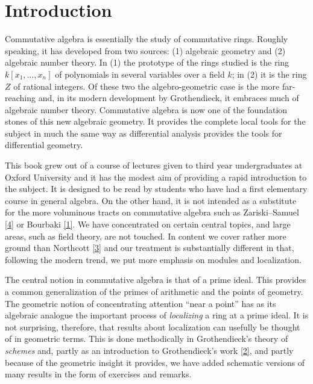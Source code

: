 \section*{Introduction}

Commutative algebra is essentially the study of commutative rings. Roughly speaking, it has developed from two sources: (1) algebraic geometry and (2) algebraic number theory. In (1) the prototype of the rings studied is the ring \(k[x_1,\ldots,x_n]\) of polynomials in several variables over a field \(k\); in (2) it is the ring \(Z\) of rational integers. Of these two the algebro-geometric case is the more far-reaching and, in its modern development by Grothendieck, it embraces much of algebraic number theory. Commutative algebra is now one of the foundation stones of this new algebraic geometry. It provides the complete local tools for the subject in much the same way as differential analysis provides the tools for differential geometry.

This book grew out of a course of lectures given to third year undergraduates at Oxford University and it has the modest aim of providing a rapid introduction to the subject. It is designed to be read by students who have had a first elementary course in general algebra. On the other hand, it is not intended as a substitute for the more voluminous tracts on commutative algebra such as Zariski--Samuel \hyperref[am:bib:4]{[4]} or Bourbaki \hyperref[am:bib:1]{[1]}. We have concentrated on certain central topics, and large areas, such as field theory, are not touched. In content we cover rather more ground than Northcott \hyperref[am:bib:3]{[3]} and our treatment is substantially different in that, following the modern trend, we put more emphasis on modules and localization.

The central notion in commutative algebra is that of a prime ideal. This provides a common generalization of the primes of arithmetic and the points of geometry. The geometric notion of concentrating attention ``near a point'' has as its algebraic analogue the important process of \emph{localizing} a ring at a prime ideal. It is not surprising, therefore, that results about localization can usefully be thought of in geometric terms. This is done methodically in Grothendieck's theory of \emph{schemes} and, partly as an introduction to Grothendieck's work \hyperref[am:bib:2]{[2]}, and partly because of the geometric insight it provides, we have added schematic versions of many results in the form of exercises and remarks.

